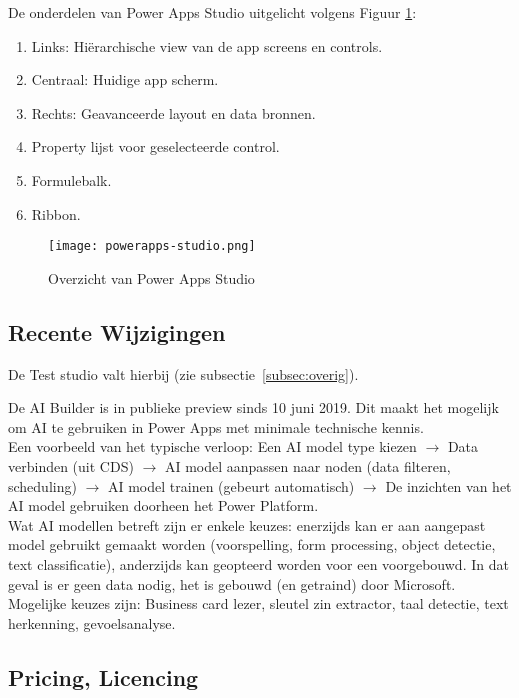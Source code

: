 De onderdelen van Power Apps Studio uitgelicht volgens Figuur \ref{fig:pastudio}:
\begin{enumerate}
    \item Links: Hiërarchische view van de app screens en controls.
    \item Centraal: Huidige app scherm.
    \item Rechts: Geavanceerde layout en data bronnen.
    \item Property lijst voor geselecteerde control.
    \item Formulebalk.
    \item Ribbon.
\end{enumerate}

\begin{figure}[h!]
    \texttt{[image: powerapps-studio.png]}
    \caption{Overzicht van Power Apps Studio \autocite{MicrosoftDocs2017}}
    \label{fig:pastudio}
\end{figure}

\subsection{Recente Wijzigingen}

De Test studio valt hierbij (zie subsectie~\ref{subsec:overig}). %

De AI Builder is in publieke preview sinds 10 juni 2019. Dit maakt het mogelijk om AI te gebruiken in Power Apps met minimale technische kennis.\\
Een voorbeeld van het typische verloop: Een AI model type kiezen $\rightarrow$ Data verbinden (uit CDS) $\rightarrow$ AI model aanpassen naar noden (data filteren, scheduling) $\rightarrow$ AI model trainen (gebeurt automatisch) $\rightarrow$ De inzichten van het AI model gebruiken doorheen het Power Platform.\\
Wat AI modellen betreft zijn er enkele keuzes: enerzijds kan er aan aangepast model gebruikt gemaakt worden (voorspelling, form processing, object detectie, text classificatie), anderzijds kan geopteerd worden voor een voorgebouwd. In dat geval is er geen data nodig, het is gebouwd (en getraind) door Microsoft. Mogelijke keuzes zijn: Business card lezer, sleutel zin extractor, taal detectie, text herkenning, gevoelsanalyse. \autocite{MicrosoftDocs2019e}


\subsection{Pricing, Licencing}

